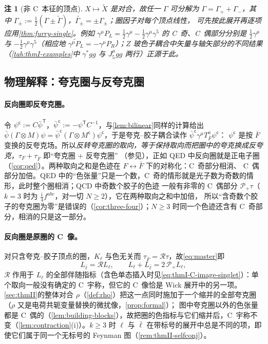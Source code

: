 \documentclass[UTF8,a4paper,11pt,fontset=fandol]{ctexart}
\theoremstyle{cplain}
\theoremstyle{cdefinition}
\theoremstyle{cremark}
\newtheorem{remark}[theorem]{注}
\numberwithin{equation}{section}
\newcommand{\tp}{\mathsf{T}}                         %
\newcommand{\Rop}{\mathcal{R}}                       %
\newcommand{\Pp}{\mathcal{P}_{+}}                    %
\newcommand{\ii}{\mathrm{i}}                        %
\newcommand{\Cconj}[1]{\widetilde{#1}}              %
\begin{document}
\begin{remark}[非 C~本征的顶点]\label{rem:thmI-decomposition}
$X\mapsto\Cconj X$ 是对合，故任一 $\Gamma$ 可分解为 $\Gamma=\Gamma_++\Gamma_-$，其中 $\Gamma_\pm:=\frac12(\Gamma\pm\Cconj\Gamma)$，$\Cconj{\Gamma_\pm}=\pm\Gamma_\pm$；圈因子对每个顶点线性，
可先按此展开再逐项应用\cref{thm:furry-single}。例如 $\gamma^\mu P_L=\frac12\gamma^\mu-\frac12\gamma^\mu\gamma^5$ 的 C~奇、C~偶部分分别是 $\frac12\gamma^\mu$ 与 $-\frac12\gamma^\mu\gamma^5$（相应地 $\Cconj{\gamma^\mu P_L}=-\gamma^\mu P_R$）；$Z$ 玻色子耦合中矢量与轴矢部分的不同结果（\cref{tab:thmI-examples}中 $\gamma^*gg$ 与 $J_5^\mu gg$ 两行）正源于此。
\end{remark}

\subsection{物理解释：夸克圈与反夸克圈}\label{sec:thmI-interpretation}

\paragraph{反向圈即反夸克圈。}令 $\psi^{\mathsf c}:=C\bar\psi^{\tp}$，$\bar\psi^{\mathsf c}:=-\psi^{\tp}C^{-1}$，与\cref{lem:bilinear}同样的计算给出
$\bar\psi(\Gamma\otimes M)\psi=\bar\psi^{\mathsf c}(\Gamma\otimes M^{\mathsf c})\psi^{\mathsf c}$，于是夸克--胶子耦合读作 $\bar\psi^{\mathsf c}\gamma^\mu T^a_{\bar F}\psi^{\mathsf c}$：
$\psi^{\mathsf c}$ 是按 $\bar F$ 变换的反夸克场。所以\emph{反转夸克圈的取向，等于保持取向而把圈中的夸克换成反夸克}，$\tau_F+\tau_{\bar F}$ 即“夸克圈 $+$ 反夸克圈”
（参见\cite{MooreGorda2023}），正如 QED 中反向圈就是正电子圈（\cref{cor:qed}）。两种取向之和是色迹在 $F\leftrightarrow\bar F$ 下的对称化：C~奇部分相消、
C~偶部分加倍。QED 中的“色张量”只是一个数，C~奇的情形就是光子数为奇数的情形，此时整个圈相消；QCD 中奇数个胶子的色迹
一般有非零的 C~偶部分 $\Pp\tau$（$k=3$ 时为 $\frac{\ii}{4}f^{abc}$，对一切 $N\ge2$），它在两种取向之和中加倍，
所以“含奇数个胶子的夸克圈为零”是错误的（\cref{cor:three-four}）；$N\ge3$ 时同一个色迹还含有 C~奇部分，相消的只是这一部分。

\paragraph{反向圈是原圈的 C~像。}对只含夸克--胶子顶点的圈，$K_\ell$ 与色无关而 $\tau_{\bar F}=\Rop\tau$，故\cref{eq:master}即
\begin{equation}\label{eq:thmI-C-image}
L_{\bar\ell}=\Rop L_\ell ,\qquad L_\ell+L_{\bar\ell}=2\,\Pp L_\ell ,
\end{equation}
$\Rop$ 作用于 $L_\ell$ 的全部伴随指标（含色单态插入时见\cref{eq:thmI-C-image-singlet}）：单个取向一般没有确定的 C~宇称，但它的 C~像恰是 Wick 展开中的另一项。
\cref{sec:thmII}的整体对合 $\rho$（\cref{def:rho}）把这一点同时施加于一个缩并的全部夸克圈（$\rho$ 又是电荷共轭变量替换的微扰像，\cref{prop:formal}）；
图中夸克圈以外的色张量都是 C~偶的（\cref{lem:building-blocks}），故把圈的色指标与它们缩并后，C~宇称不变（\cref{lem:contraction}(i)）。$k\ge3$ 时
$\ell$ 与 $\bar\ell$ 在带标号的展开中总是不同的项，即使它们属于同一个无标号的 Feynman 图（\cref{rem:thmII-selfconj}）。
\end{document}
